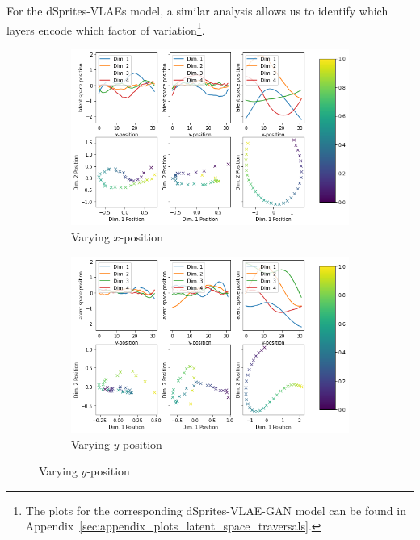 For the dSprites-\acp{VLAE} model, a similar analysis allows us to identify which layers encode which factor of variation\footnote{The plots for the corresponding dSprites-\ac{VLAE}-\ac{GAN} model can be found in Appendix~\ref{sec:appendix_plots_latent_space_traversals}.}.
\begin{figure}
    \centering
    \begin{subfigure}{.48\textwidth}
        \centering
        \includegraphics[width=\textwidth]{images/latent_space_traversals/vlae_dsprites_left_latent_space_values.png}
        \caption{Varying $x$-position}
        \label{subfig:vlae_dsprites_latent_space_values_x}
    \end{subfigure}
    \hfill
    \begin{subfigure}{.48\textwidth}
        \centering
        \includegraphics[width=\textwidth]{images/latent_space_traversals/vlae_dsprites_bottom_latent_space_values.png}
        \caption{Varying $y$-position}
        \label{subfig:vlae_dsprites_latent_space_values_y}

\end{subfigure}
\end{figure}
